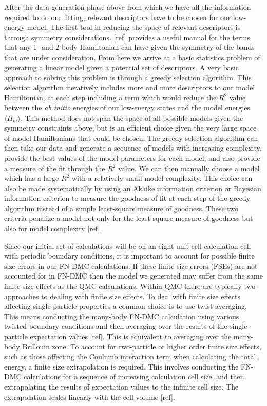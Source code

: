 \documentclass{article}
\begin{document}
After the data generation phase above from which we have all the information required to do our fitting, relevant descriptors have to be chosen for our low-energy model. 
The first tool in reducing the space of relevant descriptors is through symmetry considerations. [ref] provides a useful manual for the terms that any 1- and 2-body Hamiltonian can have given the symmetry of the bands that are under consideration. 
From here we arrive at a basic statistics problem of generating a linear model given a potential set of descriptors. 
A very basic approach to solving this problem is through a greedy selection algorithm. 
This selection algorithm iteratively includes more and more descriptors to our model Hamiltonian, at each step including a term which would reduce the $R^2$ value between the \textit{ab initio} energies of our low-energy states and the model energies $\langle H_m \rangle$. 
This method does not span the space of all possible models given the symmetry constraints above, but is an efficient choice given the very large space of model Hamiltonians that could be chosen. 
The greedy selection algorithm can then take our data and generate a sequence of models with increasing complexity, provide the best values of the model parameters for each model, and also provide a measure of the fit through the $R^2$ value. 
We can then manually choose a model which has a large $R^2$ with a relatively small model complexity. 
This choice can also be made systematically by using an Akaike information criterion or Bayesian information criterion to measure the goodness of fit at each step of the greedy algorithm instead of a simple least-square measure of goodness. 
These two criteria penalize a model not only for the least-square measure of goodness but also for model complexity [ref].

Since our initial set of calculations will be on an eight unit cell calculation cell with periodic boundary conditions, it is important to account for possible finite size errors in our FN-DMC calculations. 
If these finite size errors (FSEs) are not accounted for in FN-DMC then the model we generated may suffer from the same finite size effects as the QMC calculations. 
Within QMC there are typically two approaches to dealing with finite size effects. 
To deal with finite size effects affecting single particle properties a common choice is to use twist-averaging. 
This means conducting the many-body FN-DMC calculation using various twisted boundary conditions and then averaging over the results of the single-particle expectation values [ref].
This is equivalent to averaging over the many-body Brillouin zone. 
To account for two-particle or higher order finite size effects, such as those affecting the Coulumb interaction term when calculating the total energy, a finite size extrapolation is required. 
This involves conducting the FN-DMC calculations for a sequence of increasing calculation cell size, and then extrapolating the results of expectation values to the infinite cell size. 
The extrapolation scales linearly with the cell volume [ref].
\end{document}
